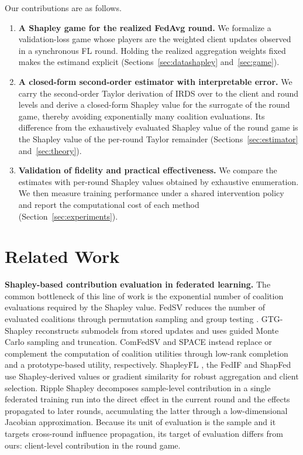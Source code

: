 \documentclass[letterpaper]{article} %
\theoremstyle{definition} %
\begin{document}
Our contributions are as follows.
\begin{enumerate}
    \item \textbf{A Shapley game for the realized FedAvg round.} We
    formalize a validation-loss game whose players are the weighted client updates
    observed in a synchronous FL round. Holding the realized aggregation
    weights fixed makes the estimand explicit
    (Sections~\ref{sec:datashapley} and~\ref{sec:game}).
    \item \textbf{A closed-form second-order estimator with interpretable
    error.} We carry the second-order Taylor derivation of IRDS over to the
    client and round levels and derive a closed-form Shapley value for the
    surrogate of the round game, thereby avoiding exponentially many
    coalition evaluations. Its difference from the exhaustively evaluated
    Shapley value of the round game is the Shapley value of the per-round Taylor remainder
    (Sections~\ref{sec:estimator} and~\ref{sec:theory}).
    \item \textbf{Validation of fidelity and practical effectiveness.} We
    compare the estimates with per-round Shapley values obtained by exhaustive
    enumeration. We then measure training performance under a shared
    intervention policy and report the computational cost of each method
    (Section~\ref{sec:experiments}).
\end{enumerate}

\section{Related Work}
\label{sec:related}

\textbf{Shapley-based contribution evaluation in federated learning.}
The common bottleneck of this line of work is the exponential number of
coalition evaluations required by the Shapley value. 
FedSV \citep{wang2020principled} reduces the number of evaluated coalitions through
permutation sampling and group testing
\citep{castro2009polynomial,jia2019towards}. GTG-Shapley
\citep{liu2022gtg} reconstructs submodels from stored updates and uses guided
Monte Carlo sampling and truncation. ComFedSV \citep{fan2022improving} and
SPACE \citep{chen2023space} instead replace or complement the computation of
coalition utilities through low-rank completion and a prototype-based utility,
respectively. ShapleyFL \citep{sun2023shapleyfl}, the FedIF \citep{tang2025lightweight} and ShapFed \citep{tastan2024redefining} use
Shapley-derived values or gradient similarity for robust aggregation and
client selection. Ripple
Shapley \citep{zeng2026ripple} decomposes sample-level contribution in a
single federated training run into the direct effect in the current round and
the effects propagated to later rounds, accumulating the latter through a
low-dimensional Jacobian approximation. Because its unit of evaluation is the
sample and it targets cross-round influence propagation, its target of
evaluation differs from ours: client-level contribution in the round
game.
\end{document}
